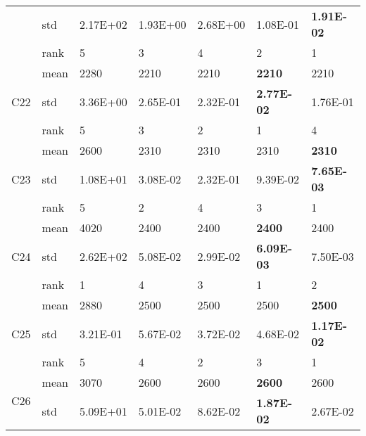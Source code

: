 \begin{table}[]
\begin{tabular}{|l|l|l|l|l|l|l|}
                     & std  & 2.17E+02 & 1.93E+00          & 2.68E+00          & 1.08E-01          & \textbf{1.91E-02} \\ \cline{2-7} 
                     & rank & 5        & 3                 & 4                 & 2                 & 1                 \\ \hline
\multirow{3}{*}{C22} & mean & 2280     & 2210              & 2210              & \textbf{2210}     & 2210              \\ \cline{2-7} 
                     & std  & 3.36E+00 & 2.65E-01          & 2.32E-01          & \textbf{2.77E-02} & 1.76E-01          \\ \cline{2-7} 
                     & rank & 5        & 3                 & 2                 & 1                 & 4                 \\ \hline
\multirow{3}{*}{C23} & mean & 2600     & 2310              & 2310              & 2310              & \textbf{2310}     \\ \cline{2-7} 
                     & std  & 1.08E+01 & 3.08E-02          & 2.32E-01          & 9.39E-02          & \textbf{7.65E-03} \\ \cline{2-7} 
                     & rank & 5        & 2                 & 4                 & 3                 & 1                 \\ \hline
\multirow{3}{*}{C24} & mean & 4020     & 2400              & 2400              & \textbf{2400}     & 2400              \\ \cline{2-7} 
                     & std  & 2.62E+02 & 5.08E-02          & 2.99E-02          & \textbf{6.09E-03} & 7.50E-03          \\ \cline{2-7} 
                     & rank & 1        & 4                 & 3                 & 1                 & 2                 \\ \hline
\multirow{3}{*}{C25} & mean & 2880     & 2500              & 2500              & 2500              & \textbf{2500}     \\ \cline{2-7} 
                     & std  & 3.21E-01 & 5.67E-02          & 3.72E-02          & 4.68E-02          & \textbf{1.17E-02} \\ \cline{2-7} 
                     & rank & 5        & 4                 & 2                 & 3                 & 1                 \\ \hline
\multirow{3}{*}{C26} & mean & 3070     & 2600              & 2600              & \textbf{2600}     & 2600              \\ \cline{2-7} 
                     & std  & 5.09E+01 & 5.01E-02          & 8.62E-02          & \textbf{1.87E-02} & 2.67E-02          \\ \cline{2-7} 

\end{tabular}
\end{table}
